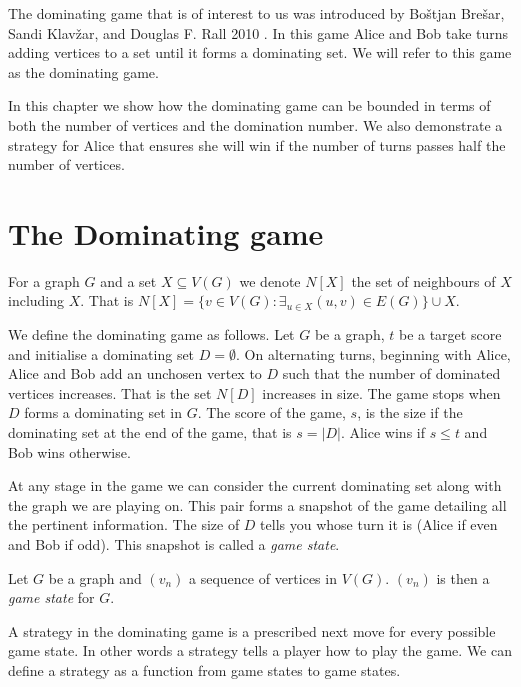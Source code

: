 The dominating game that is of interest to us was introduced by Bo\v{s}tjan Bre\v{s}ar, Sandi Klav\v{z}ar, and Douglas F. Rall 2010 \cite{BrKlRa2010}. In this game Alice and Bob take turns adding vertices to a set until it forms a dominating set. We will refer to this game as the dominating game.

In this chapter we show how the dominating game can be bounded in terms of both the number of vertices and the domination number. We also demonstrate a strategy for Alice that ensures she will win if the number of turns passes half the number of vertices.


\section{The Dominating game}

For a graph $G$ and a set $X\subseteq V(G)$ we denote $N[X]$ the set of neighbours of $X$ including $X$. That is $N[X] = \{v\in V(G) : \exists_{u\in X} (u,v)\in E(G)\}\cup X$. 

We define the dominating game as follows. Let $G$ be a graph, $t$ be a target score and initialise a dominating set $D=\emptyset$. On alternating turns, beginning with Alice, Alice and Bob add an unchosen vertex to $D$ such that the number of dominated vertices increases. That is the set $N[D]$ increases in size. The game stops when $D$ forms a dominating set in $G$. The score of the game, $s$, is the size if the dominating set at the end of the game, that is $s=|D|$. Alice wins if $s\leq t$ and Bob wins otherwise.

At any stage in the game we can consider the current dominating set along with the graph we are playing on. This pair forms a snapshot of the game detailing all the pertinent information. The size of $D$ tells you whose turn it is (Alice if even and Bob if odd). This snapshot is called a \textit{game state}. 

\begin{definition}
    Let $G$ be a graph and $(v_n)$ a sequence of vertices in $V(G)$. $(v_n)$ is then a \textit{game state} for $G$.
\end{definition}

A strategy in the dominating game is a prescribed next move for every possible game state. In other words a strategy tells a player how to play the game. We can define a strategy as a function from game states to game states. 

